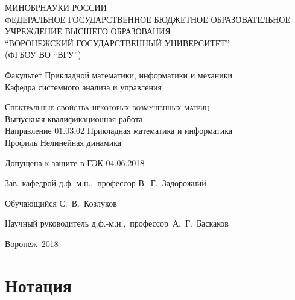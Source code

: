\documentclass[14pt,a4paper]{extarticle}
\numberwithin{equation}{section}
\theoremstyle{definition}
\begin{document}

\newpage

\makeatletter
{
  \null
  \thispagestyle{empty}
  \newpage
}

\setcounter{page}{0}
\begin{center}
  МИНОБРНАУКИ РОССИИ\\
  ФЕДЕРАЛЬНОЕ ГОСУДАРСТВЕННОЕ БЮДЖЕТНОЕ ОБРАЗОВАТЕЛЬНОЕ УЧРЕЖДЕНИЕ ВЫСШЕГО
  ОБРАЗОВАНИЯ\\ ``ВОРОНЕЖСКИЙ ГОСУДАРСТВЕННЫЙ УНИВЕРСИТЕТ''\\
(ФГБОУ ВО ``ВГУ'')
\end{center}

\vfill

\begin{center}
  Факультет Прикладной математики, информатики и механики\\
  Кафедра системного анализа и управления
\end{center}

\vfill

\begin{center}
  \textsc{\Large Спектральные свойства некоторых возмущённых матриц}\\[.5cm]
  Выпускная квалификационная работа\\
  Направление 01.03.02 Прикладная математика и информатика\\
  Профиль Нелинейная динамика
\end{center}

\vfill
\begin{center}
  {Допущена к защите в ГЭК 04.06.2018}
  \end{center}

\vfill
\begin{center}
  {Зав. кафедрой \hfill д.ф.-м.н.,~профессор В.~Г.~Задорожний}
  \vspace{1cm}

  {Обучающийся \hfill С.~В.~Козлуков}

  \vspace{1cm}
  {Научный руководитель \hfill д.ф.-м.н.,~профессор~А.~Г.~Баскаков}
\end{center}
 
\vfill
\begin{center}
  Воронеж~2018
\end{center}

{
\pagestyle{empty}
\newpage
}
\setcounter{tocdepth}{2}
\tableofcontents
\newpage

\section{Нотация}
\end{document}
